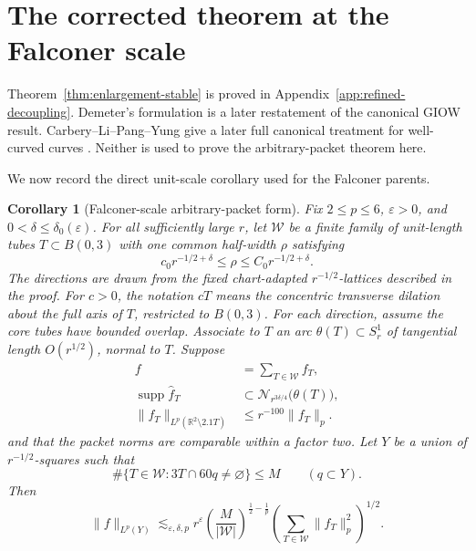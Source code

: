 \documentclass[11pt,letterpaper]{amsart}
\newtheorem{corollary}[corollary]{Corollary}
\newcommand{\R}{\mathbb{R}}
\newcommand{\supp}{\operatorname{supp}}
\newcommand{\cN}{\mathcal{N}}
\newcommand{\wh}{\widehat}
\newcommand{\eps}{\varepsilon}
\newcommand{\cW}{\mathcal{W}}
\newcommand{\abs}[1]{\lvert#1\rvert}
\newcommand{\norm}[1]{\lVert#1\rVert}
\begin{document}
\section{The corrected theorem at the Falconer scale}
\label{sec:corrected-decoupling}

Theorem~\ref{thm:enlargement-stable} is proved in
Appendix~\ref{app:refined-decoupling}.  Demeter's formulation
\cite[Theorem~1.4]{DemeterRefined} is a later restatement of the canonical
GIOW result.  Carbery--Li--Pang--Yung give a later full canonical treatment
for well-curved curves \cite{CLPY}.  Neither is used to prove the
arbitrary-packet theorem here.

We now record the direct unit-scale corollary used for the Falconer parents.

\begin{corollary}[Falconer-scale arbitrary-packet form]
\label{cor:falconer-packets}
Fix \(2\le p\le6\), \(\eps>0\), and \(0<\delta\le\delta_0(\eps)\).
For all sufficiently large \(r\), let \(\cW\) be a finite family of
unit-length tubes \(T\subset B(0,3)\) with one common half-width \(\rho\)
satisfying
\[
 c_0r^{-1/2+\delta}\le\rho\le C_0r^{-1/2+\delta}.
\]
The directions are drawn from the fixed chart-adapted \(r^{-1/2}\)-lattices
described in the proof.  For \(c>0\), the notation \(cT\) means the
concentric transverse dilation about the full axis of \(T\), restricted to
\(B(0,3)\).  For each direction, assume the core tubes have
bounded overlap.  Associate to \(T\) an arc \(\theta(T)\subset S_r^1\) of
tangential length \(O(r^{1/2})\), normal to \(T\).  Suppose
\[
\begin{aligned}
 f&=\sum_{T\in\cW}f_T,\\
 \supp\wh f_T&\subset
 \cN_{r^{3\delta/4}}\bigl(\theta(T)\bigr),\\
 \norm{f_T}_{L^p(\R^2\setminus2.1T)}
 &\le r^{-100}\norm{f_T}_p.
\end{aligned}
\]
and that the packet norms are comparable within a factor two.  Let \(Y\)
be a union of \(r^{-1/2}\)-squares such that
\[
 \#\{T\in\cW:3T\cap60q\ne\varnothing\}\le M
 \qquad(q\subset Y).
\]
Then
\begin{equation}\label{eq:falconer-packet-cor}
 \norm{f}_{L^p(Y)}
 \lesssim_{\eps,\delta,p}
 r^\eps
 \left(\frac{M}{\abs{\cW}}\right)^{\frac12-\frac1p}
 \left(\sum_{T\in\cW}\norm{f_T}_p^2\right)^{1/2}.
\end{equation}
\end{corollary}
\end{document}
